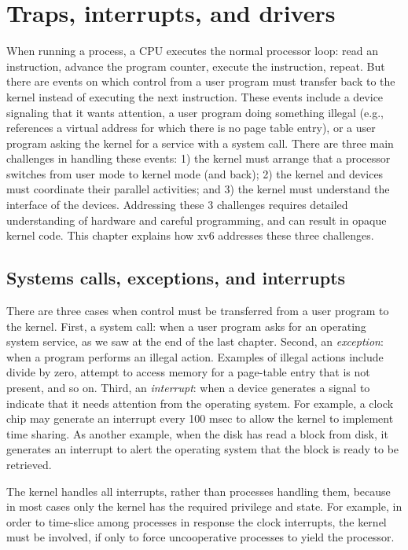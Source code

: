 \chapter{Traps, interrupts, and drivers}
\label{CH:TRAP}

When running a process, a CPU executes the normal processor loop: read an
instruction, advance the program counter, execute the instruction, repeat.  But
there are events on which control from a user program must transfer back to the
kernel instead of executing the next instruction.  These events include a device
signaling that it wants attention, a user program doing something illegal (e.g.,
references a virtual address for which there is no page table entry), or a user
program asking the kernel for a service with a system call.  There are three
main challenges in handling these events: 1) the kernel must arrange that a
processor switches from user mode to kernel mode (and back); 2) the kernel and
devices must coordinate their parallel activities; and 3) the kernel must
understand the interface of the devices.  Addressing these 3 challenges requires
detailed understanding of hardware and careful programming, and can result in
opaque kernel code.  This chapter explains how xv6 addresses these three
challenges.
\section{Systems calls, exceptions, and interrupts}
There are three cases when control must be transferred from a user program to
the kernel. First, a system call: when a user program asks for an operating
system service, as we saw at the end of the last chapter.
Second, an
\textit{exception}:
when a program performs an illegal action. Examples of illegal actions include
divide by zero, attempt to access memory for a page-table entry that is not
present, and so on.  Third, an
\textit{interrupt}:
when a device generates a signal to indicate that
it needs attention from the operating system.  For example, a clock chip may
generate an interrupt every 100 msec to allow the kernel to implement
time sharing.  As another example, when the disk has read a block from
disk, it generates an interrupt to alert the operating system that the
block is ready to be retrieved.

The kernel handles all interrupts, rather than processes
handling them, because in most cases only the kernel has the
required privilege and state. For example, in order to time-slice
among processes in response the clock interrupts, the kernel
must be involved, if only to force uncooperative processes to
yield the processor.


